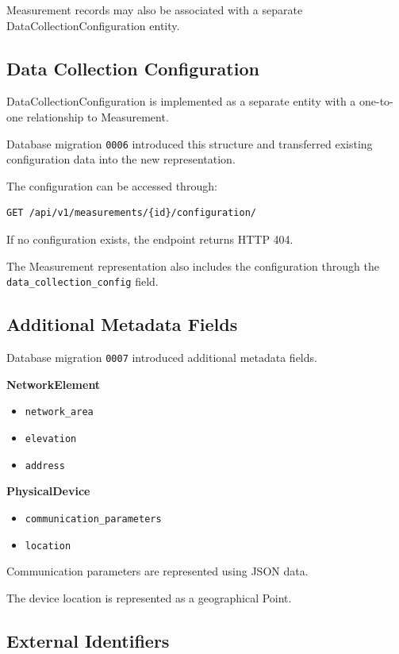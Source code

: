 \documentclass[11pt,a4paper]{article}
\begin{document}
Measurement records may also be associated with
a separate DataCollectionConfiguration entity.

\subsection{Data Collection Configuration}

DataCollectionConfiguration is implemented as
a separate entity with a one-to-one relationship
to Measurement.

Database migration \texttt{0006} introduced this
structure and transferred existing configuration
data into the new representation.

The configuration can be accessed through:

\begin{lstlisting}
GET /api/v1/measurements/{id}/configuration/
\end{lstlisting}

If no configuration exists, the endpoint returns
HTTP 404.

The Measurement representation also includes
the configuration through the
\texttt{data\_collection\_config} field.

\subsection{Additional Metadata Fields}

Database migration \texttt{0007} introduced
additional metadata fields.

\textbf{NetworkElement}

\begin{itemize}
    \item \texttt{network\_area}
    \item \texttt{elevation}
    \item \texttt{address}
\end{itemize}

\textbf{PhysicalDevice}

\begin{itemize}
    \item \texttt{communication\_parameters}
    \item \texttt{location}
\end{itemize}

Communication parameters are represented using
JSON data.

The device location is represented as a
geographical Point.

\subsection{External Identifiers}
\end{document}
